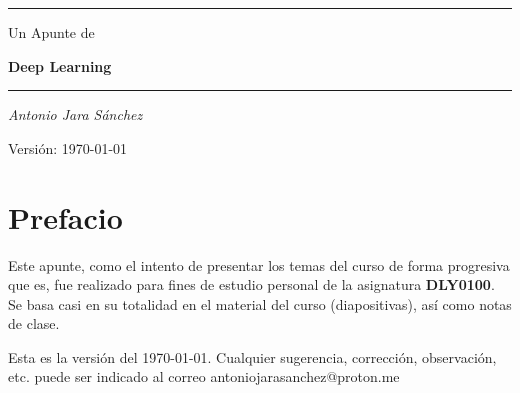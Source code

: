 \documentclass[letterpaper,twoside]{book}
\makeatletter
\def\cleardoublepage{%
  \clearpage%
  \ifodd\c@page\else
    \hbox{}%
    \thispagestyle{empty}%
    \newpage%
  \fi}
\makeatother
\begin{document}
\thispagestyle{empty}

\begin{titlepage}
\begin{center}
\vspace*{\fill}

\rule{\textwidth}{1pt}
\vspace{1cm}

{\Large Un Apunte de}

\vspace{0.5cm}
{\Huge \textbf{Deep Learning}}

\vspace{1cm}
\rule{\textwidth}{0.8pt}

\vspace{2.5cm}

\Large \textit{Antonio Jara Sánchez}

\vspace{3cm}

\normalsize Versión: \today

\vspace*{\fill}
\end{center}
\end{titlepage}
\cleardoublepage

\pagestyle{plain}
\chapter*{Prefacio}

Este apunte, como el intento de presentar los temas del curso de forma progresiva que es, fue realizado para fines de estudio personal de la asignatura \textbf{DLY0100}. Se basa casi en su totalidad en el material del curso (diapositivas), así como notas de clase.

\medskip

Esta es la versión del \today. Cualquier sugerencia, corrección, observación, etc. puede ser indicado al correo antoniojarasanchez@proton.me

\cleardoublepage

\tableofcontents

\cleardoublepage
{}
\setcounter{page}{1}
\pagestyle{fancy}



\end{document}
